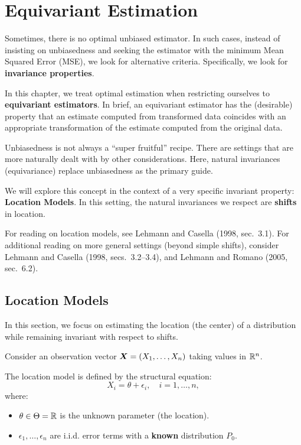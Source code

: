 \chapter{Equivariant Estimation}
\label{cha:equi}

Sometimes, there is no optimal unbiased estimator. In such cases, instead of insisting on unbiasedness and seeking the estimator with the minimum Mean Squared Error (MSE), we look for alternative criteria. Specifically, we look for \textbf{invariance properties}.

In this chapter, we treat optimal estimation when restricting ourselves to \textbf{equivariant estimators}. In brief, an equivariant estimator has the (desirable) property that an estimate computed from transformed data coincides with an appropriate transformation of the estimate computed from the original data.

\begin{note}
Unbiasedness is not always a ``super fruitful'' recipe. There are settings that are more naturally dealt with by other considerations. Here, natural invariances (equivariance) replace unbiasedness as the primary guide.
\end{note}

We will explore this concept in the context of a very specific invariant property: \textbf{Location Models}. In this setting, the natural invariances we respect are \textbf{shifts} in location.

For reading on location models, see Lehmann and Casella (1998, sec.~3.1). For additional reading on more general settings (beyond simple shifts), consider Lehmann and Casella (1998, secs.~3.2--3.4), and Lehmann and Romano (2005, sec.~6.2).

\section{Location Models}
\label{sec:loc_mod}

In this section, we focus on estimating the location (the center) of a distribution while remaining invariant with respect to shifts.


Consider an observation vector \(\boldsymbol{X} = (X_1, \dots, X_n)\) taking values in \(\mathbb{R}^n\).

\begin{definition}
\label{def:loc_model}
The location model is defined by the structural equation:
\begin{equation}
    X_i = \theta + \epsilon_i, \quad i = 1, \dots, n,
    \label{eq:loc_model}
\end{equation}
where:
\begin{itemize}
    \item \(\theta \in \Theta = \mathbb{R}\) is the unknown parameter (the location).
    \item \(\epsilon_1, \dots, \epsilon_n\) are i.i.d. error terms with a \textbf{known} distribution \(P_0\).
\end{itemize}
\end{definition}

